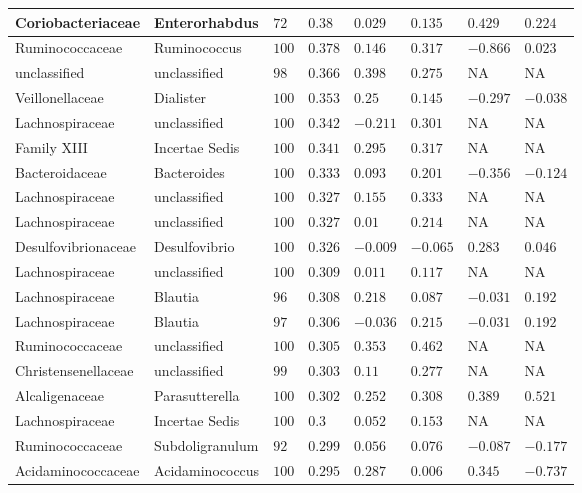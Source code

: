 \begin{table}[!ht]
\begin{tiny}
\begin{tabular}{|l|l|l|l|l|l|l|l|}
Coriobacteriaceae & Enterorhabdus & $72$ & $0.38$ & $0.029$ & $0.135$ & $0.429$ & $0.224$ \\ \hline
Ruminococcaceae & Ruminococcus & $100$ & $0.378$ & $0.146$ & $0.317$ & $-0.866$ & $0.023$ \\ \hline
unclassified & unclassified & $98$ & $0.366$ & $0.398$ & $0.275$ & NA & NA \\ \hline
Veillonellaceae & Dialister & $100$ & $0.353$ & $0.25$ & $0.145$ & $-0.297$ & $-0.038$ \\ \hline
Lachnospiraceae & unclassified & $100$ & $0.342$ & $-0.211$ & $0.301$ & NA & NA \\ \hline
Family XIII & Incertae Sedis & $100$ & $0.341$ & $0.295$ & $0.317$ & NA & NA \\ \hline
Bacteroidaceae & Bacteroides & $100$ & $0.333$ & $0.093$ & $0.201$ & $-0.356$ & $-0.124$ \\ \hline
Lachnospiraceae & unclassified & $100$ & $0.327$ & $0.155$ & $0.333$ & NA & NA \\ \hline
Lachnospiraceae & unclassified & $100$ & $0.327$ & $0.01$ & $0.214$ & NA & NA \\ \hline
Desulfovibrionaceae & Desulfovibrio & $100$ & $0.326$ & $-0.009$ & $-0.065$ & $0.283$ & $0.046$ \\ \hline
Lachnospiraceae & unclassified & $100$ & $0.309$ & $0.011$ & $0.117$ & NA & NA \\ \hline
Lachnospiraceae & Blautia & $96$ & $0.308$ & $0.218$ & $0.087$ & $-0.031$ & $0.192$ \\ \hline
Lachnospiraceae & Blautia & $97$ & $0.306$ & $-0.036$ & $0.215$ & $-0.031$ & $0.192$ \\ \hline
Ruminococcaceae & unclassified & $100$ & $0.305$ & $0.353$ & $0.462$ & NA & NA \\ \hline
Christensenellaceae & unclassified & $99$ & $0.303$ & $0.11$ & $0.277$ & NA & NA \\ \hline
Alcaligenaceae & Parasutterella & $100$ & $0.302$ & $0.252$ & $0.308$ & $0.389$ & $0.521$ \\ \hline
Lachnospiraceae & Incertae Sedis & $100$ & $0.3$ & $0.052$ & $0.153$ & NA & NA \\ \hline
Ruminococcaceae & Subdoligranulum & $92$ & $0.299$ & $0.056$ & $0.076$ & $-0.087$ & $-0.177$ \\ \hline
Acidaminococcaceae & Acidaminococcus & $100$  & $0.295$ & $0.287$ & $0.006$ & $0.345$ & $-0.737$ \\ \hline
\end{tabular}

\end{tiny}
\end{table}
